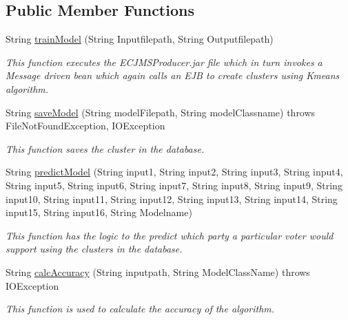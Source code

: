 \subsection*{Public Member Functions}
\begin{DoxyCompactItemize}
\item 
String \hyperlink{classorg_1_1jboss_1_1as_1_1quickstarts_1_1greeter_1_1domain_1_1_managed_bean_model_dao_a3249ae7d8c010b92d8226cffbbe2de78}{train\+Model} (String Inputfilepath, String Outputfilepath)
\begin{DoxyCompactList}\small\item\em This function executes the E\+C\+J\+M\+S\+Producer.\+jar file which in turn invokes a Message driven bean which again calls an E\+JB to create clusters using Kmeans algorithm. \end{DoxyCompactList}\item 
String \hyperlink{classorg_1_1jboss_1_1as_1_1quickstarts_1_1greeter_1_1domain_1_1_managed_bean_model_dao_a5be76afee3c059eafe8e617578bc1f26}{save\+Model} (String model\+Filepath, String model\+Classname)  throws File\+Not\+Found\+Exception, I\+O\+Exception
\begin{DoxyCompactList}\small\item\em This function saves the cluster in the database. \end{DoxyCompactList}\item 
String \hyperlink{classorg_1_1jboss_1_1as_1_1quickstarts_1_1greeter_1_1domain_1_1_managed_bean_model_dao_a4341e2de86398808ce85aed287d16cf5}{predict\+Model} (String input1, String input2, String input3, String input4, String input5, String input6, String input7, String input8, String input9, String input10, String input11, String input12, String input13, String input14, String input15, String input16, String Modelname)
\begin{DoxyCompactList}\small\item\em This function has the logic to the predict which party a particular voter would support using the clusters in the database. \end{DoxyCompactList}\item 
String \hyperlink{classorg_1_1jboss_1_1as_1_1quickstarts_1_1greeter_1_1domain_1_1_managed_bean_model_dao_ab92b0e5250b87e53aedff8796054c433}{calc\+Accuracy} (String inputpath, String Model\+Class\+Name)  throws I\+O\+Exception
\begin{DoxyCompactList}\small\item\em This function is used to calculate the accuracy of the algorithm. \end{DoxyCompactList}\end{DoxyCompactItemize}
